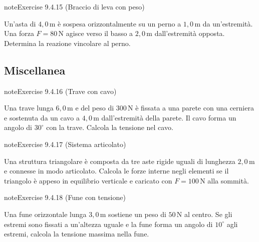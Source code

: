 \documentclass[letterpaper,10pt,italian]{jupyterBook}
\begin{document}
\begin{sphinxadmonition}{note}{Exercise 9.4.15 (Braccio di leva con peso)}



\sphinxAtStartPar
Un’asta di \(4,0 \, \text{m}\) è sospesa orizzontalmente su un perno a \(1,0 \, \text{m}\) da un’estremità. Una forza \(F = 80 \, \text{N}\) agisce verso il basso a \(2,0 \, \text{m}\) dall’estremità opposta. Determina la reazione vincolare al perno.
\end{sphinxadmonition}


\subsection{Miscellanea}
\label{\detokenize{ch/mechanics/statics-problems:miscellanea}} \label{exercise:ch/mechanics/statics-problems-exercise-15}

\begin{sphinxadmonition}{note}{Exercise 9.4.16 (Trave con cavo)}



\sphinxAtStartPar
Una trave lunga \(6,0 \, \text{m}\) e del peso di \(300 \, \text{N}\) è fissata a una parete con una cerniera e sostenuta da un cavo a \(4,0 \, \text{m}\) dall’estremità della parete. Il cavo forma un angolo di \(30^\circ\) con la trave. Calcola la tensione nel cavo.
\end{sphinxadmonition}
 \label{exercise:ch/mechanics/statics-problems-exercise-16}

\begin{sphinxadmonition}{note}{Exercise 9.4.17 (Sistema articolato)}



\sphinxAtStartPar
Una struttura triangolare è composta da tre aste rigide uguali di lunghezza \(2,0 \, \text{m}\) e connesse in modo articolato. Calcola le forze interne negli elementi se il triangolo è appeso in equilibrio verticale e caricato con \(F = 100 \, \text{N}\) alla sommità.
\end{sphinxadmonition}
 \label{exercise:ch/mechanics/statics-problems-exercise-17}

\begin{sphinxadmonition}{note}{Exercise 9.4.18 (Fune con tensione)}



\sphinxAtStartPar
Una fune orizzontale lunga \(3,0 \, \text{m}\) sostiene un peso di \(50 \, \text{N}\) al centro. Se gli estremi sono fissati a un’altezza uguale e la fune forma un angolo di \(10^\circ\) agli estremi, calcola la tensione massima nella fune.
\end{sphinxadmonition}
 \label{exercise:ch/mechanics/statics-problems-exercise-18}
\end{document}
